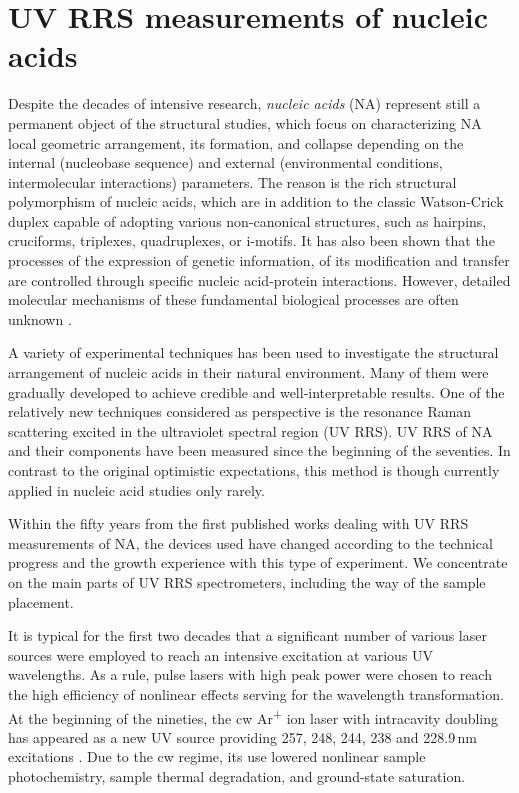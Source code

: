 \chapter{UV RRS measurements of nucleic acids}

Despite the decades of intensive research, \emph{nucleic acids} (NA) represent
still a permanent object of the structural studies, which focus on
characterizing NA local geometric arrangement, its formation, and collapse
depending on the internal (nucleobase sequence) and external (environmental
conditions, intermolecular interactions) parameters.
The reason is the rich structural polymorphism of nucleic acids, which are in
addition to the classic Watson-Crick duplex capable of adopting various
non-canonical structures, such as hairpins, cruciforms, triplexes,
quadruplexes, or i-motifs.
It has also been shown that the processes of the expression of genetic
information, of its modification and transfer are controlled through specific
nucleic acid-protein interactions.
However, detailed molecular mechanisms of these fundamental biological
processes are often unknown
\parencite{%
	Bansal2014,%
	Kaushik2016,%
	Yamamoto2021%
}.

A variety of experimental techniques has been used to investigate the
structural arrangement of nucleic acids in their natural environment.
Many of them were gradually developed to achieve credible and
well-interpretable results.
One of the relatively new techniques considered as perspective is the
resonance Raman scattering excited in the ultraviolet spectral region (UV RRS).
UV RRS of NA and their components have been measured since the beginning of
the seventies.
In contrast to the original optimistic expectations, this method is though
currently applied in nucleic acid studies only rarely.

Within the fifty years from the first published works dealing with UV RRS
measurements of NA, the devices used have changed according to the technical
progress and the growth experience with this type of experiment.
We concentrate on the main parts of UV RRS spectrometers, including the way of
the sample placement.

It is typical for the first two decades that a significant number of various
laser sources were employed to reach an intensive excitation at various UV
wavelengths.
As a rule, pulse lasers with high peak power were chosen to reach the high
efficiency of nonlinear effects serving for the wavelength transformation.
At the beginning of the nineties,
the cw Ar\textsuperscript{+} ion laser with intracavity
doubling has appeared as a new UV source providing 257, 248, 244, 238 and
228.9\,nm excitations
\parencite{%
	Asher1993b%
}.
Due to the cw regime, its use lowered nonlinear sample photochemistry, sample
thermal degradation, and ground-state saturation.

